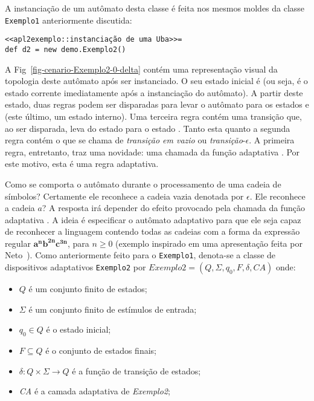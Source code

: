 \noindent
A instanciação de um autômato desta classe é feita nos mesmos moldes da classe \lstinline|Exemplo1| anteriormente discutida:

\begin{lstlisting}
<<apl2exemplo::instanciação de uma Uba>>=
def d2 = new demo.Exemplo2()
\end{lstlisting}

\noindent
A Fig~\ref{fig-cenario-Exemplo2-0-delta} contém uma representação visual da topologia deste autômato após ser instanciado. O seu estado inicial é  (ou seja, é o estado corrente imediatamente após a instanciação do autômato). A partir deste estado, duas regras podem ser disparadas para levar o autômato para os estados  e  (este último, um estado interno). Uma terceira regra contém uma transição que, ao ser disparada, leva  do estado  para o estado . Tanto esta quanto a segunda regra contém o que se chama de \textit{transição em vazio} ou \textit{transição}-$\epsilon$. A primeira regra, entretanto, traz uma novidade: uma chamada da função adaptativa . Por este motivo, esta é uma regra adaptativa.


Como se comporta o autômato  durante o processamento de uma cadeia de símbolos? Certamente ele reconhece a cadeia vazia denotada por $\epsilon$. Ele reconhece a cadeia $a$? A resposta irá depender do efeito provocado pela chamada da função adaptativa . A ideia é especificar o autômato adaptativo para que ele seja capaz de reconhecer a linguagem contendo todas as cadeias com a forma da expressão regular $\mathbf{a^nb^{2n}c^{3n}}$, para $n \geq 0$ (exemplo inspirado em uma apresentação feita por Neto~\cite{neto:2008}). Como anteriormente feito para o \lstinline|Exemplo1|, denota-se a classe de dispositivos adaptativos \lstinline|Exemplo2| por $\textit{Exemplo2}=(Q, \Sigma, q_0, F, \delta, \textit{CA})$ onde:

\begin{itemize}
\item $Q$ é um conjunto finito de estados;
\item $\Sigma$ é um conjunto finito de estímulos de entrada;
\item $q_0 \in Q$ é o estado inicial;
\item $F\subseteq Q$ é o conjunto de estados finais;
\item $\delta:Q\times\Sigma \rightarrow Q$ é a função de transição de estados;
\item \textit{CA} é a camada adaptativa de \textit{Exemplo2};
\end{itemize}

